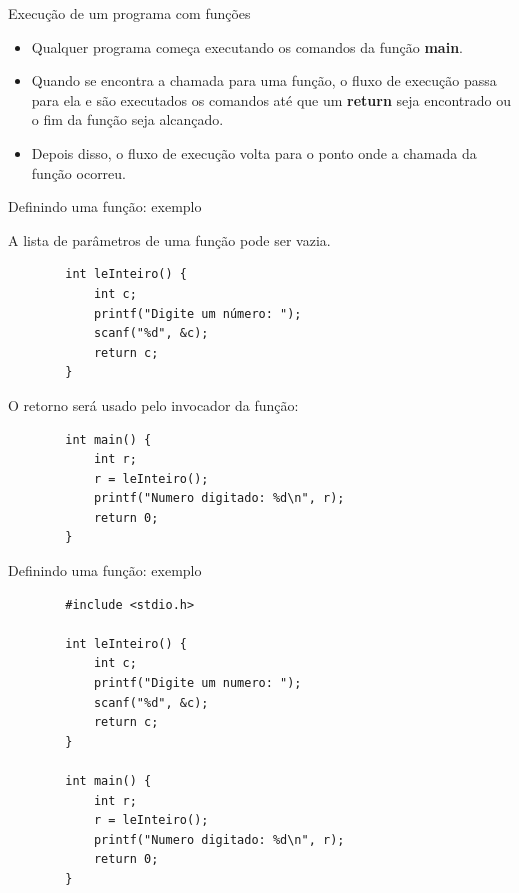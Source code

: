 \documentclass[handout]{beamer}
\begin{document}
\begin{frame}[fragile]{Execução de um programa com funções}
    \begin{itemize}[<+->]
        \item Qualquer programa começa executando os comandos da função {\bf main}.
        \item Quando se encontra a chamada para uma função, o fluxo de execução passa para ela e são executados os comandos até que um {\bf return} seja encontrado ou o fim da função seja alcançado.
        \item Depois disso, o fluxo de execução volta para o ponto onde a chamada da função ocorreu.
    \end{itemize}
\end{frame}

\begin{frame}[fragile]{Definindo uma função: exemplo}

    A lista de parâmetros de uma função pode ser vazia.

    \begin{verbatim}
        int leInteiro() {
            int c;
            printf("Digite um número: ");
            scanf("%d", &c);
            return c;
        }
    \end{verbatim}

    O retorno será usado pelo invocador da função:

    \begin{verbatim}
        int main() {
            int r;
            r = leInteiro();
            printf("Numero digitado: %d\n", r);
            return 0;
        }
    \end{verbatim}
\end{frame}

\begin{frame}[fragile]{Definindo uma função: exemplo}

    \begin{verbatim}
        #include <stdio.h>

        int leInteiro() {
            int c;
            printf("Digite um numero: ");
            scanf("%d", &c);
            return c;
        }

        int main() {
            int r;
            r = leInteiro();
            printf("Numero digitado: %d\n", r);
            return 0;
        }
    \end{verbatim}
\end{frame}
\end{document}
